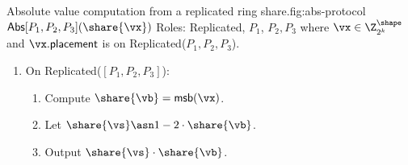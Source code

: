 \begin{Boxfig}{Absolute value computation from a replicated ring share.}{fig:abs-protocol}
  {$\mathsf{Abs}[P_1, P_2, P_3](\share{\vx})$}
  Roles: Replicated, $P_1$, $P_2, P_3$ where $\vx \in \Z_{2^k}^\shape$ and
  $\vx.\mathsf{placement}$ is on Replicated($P_1, P_2, P_3$).

  \begin{enumerate}
  \item On Replicated($[P_1, P_2, P_3]$):
  \begin{enumerate}
    \item Compute $\share{\vb} = \mathsf{msb}(\vx)$.
    \item Let $\share{\vs} \asn 1 - 2 \cdot \share{\vb}$.
    \item Output $\share{\vs} \cdot \share{\vb}$.
  \end{enumerate}
\end{enumerate}

\end{Boxfig}

